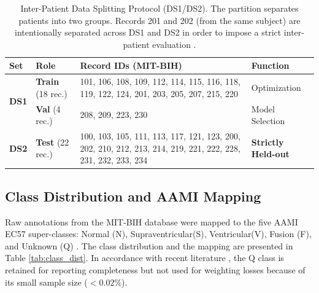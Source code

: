 \documentclass[pdflatex,sn-mathphys-num]{sn-jnl}
\theoremstyle{thmstyleone}
\theoremstyle{thmstyletwo}
\theoremstyle{thmstylethree}
\begin{document}
\begin{table}[ht]
\caption{Inter-Patient Data Splitting Protocol (DS1/DS2). The partition separates patients into two groups. Records 201 and 202 (from the same subject) are intentionally separated across DS1 and DS2 in order to impose a strict inter-patient evaluation \cite{farag_tiny_2023}.}
\label{tab:split_protocol}
\centering
\footnotesize 
\begin{tabular}{@{}l l p{6.5cm} l@{}} 
\toprule
\textbf{Set} & \textbf{Role} & \textbf{Record IDs (MIT-BIH)} & \textbf{Function} \\ \midrule
\multirow{2}{*}{\textbf{DS1}} & \textbf{Train} (18 rec.) & 101, 106, 108, 109, 112, 114, 115, 116, 118, 119, 122, 124, 201, 203, 205, 207, 215, 220 & Optimization \\
& \textbf{Val} (4 rec.) & 208, 209, 223, 230 & Model Selection \\ \midrule
\textbf{DS2} & \textbf{Test} (22 rec.) & 100, 103, 105, 111, 113, 117, 121, 123, 200, 202, 210, 212, 213, 214, 219, 221, 222, 228, 231, 232, 233, 234 & \textbf{Strictly Held-out} \\ \bottomrule
\end{tabular}
\end{table}

\subsection{Class Distribution and AAMI Mapping}
Raw annotations from the MIT-BIH database were mapped to the five AAMI EC57 super-classes: Normal (N), Supraventricular(S), Ventricular(V), Fusion (F), and Unknown (Q) \cite{xiao_deep_2023, luz_survey_2016}. The class distribution and the mapping are presented in Table \ref{tab:class_dist}. In accordance with recent literature \cite{farag_tiny_2023}, the Q class is retained for reporting completeness but not used for weighting losses because of its small sample size ($< 0.02\%$).
\end{document}
